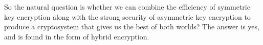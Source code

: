 So the natural question is whether we can combine the efficiency of symmetric key encryption along with the strong security of asymmetric key encryption to produce a cryptosystem that gives us the best of both worlds? The answer is yes, and is found in the form of hybrid encryption.

\label{sec:intro}

